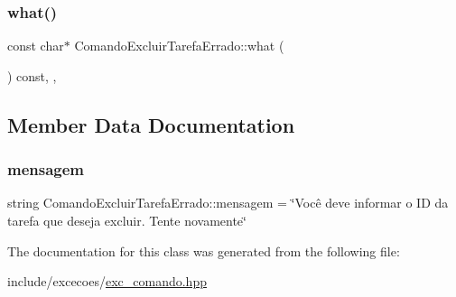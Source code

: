 \subsubsection{\texorpdfstring{what()}{what()}}
{\footnotesize\ttfamily const char$\ast$ Comando\+Excluir\+Tarefa\+Errado\+::what (\begin{DoxyParamCaption}{ }\end{DoxyParamCaption}) const\hspace{0.3cm}{\ttfamily [inline]}, {\ttfamily [override]}, {\ttfamily [noexcept]}}



\subsection{Member Data Documentation}
\mbox{\label{classComandoExcluirTarefaErrado_a0223bc12d367ca404bab4ec1f5a084cf}} 
\subsubsection{\texorpdfstring{mensagem}{mensagem}}
{\footnotesize\ttfamily string Comando\+Excluir\+Tarefa\+Errado\+::mensagem = \char`\"{}Você deve informar o ID da tarefa que deseja excluir. Tente novamente\char`\"{}\hspace{0.3cm}{\ttfamily [private]}}



The documentation for this class was generated from the following file\+:\begin{DoxyCompactItemize}
\item 
include/excecoes/\hyperlink{exc__comando_8hpp}{exc\+\_\+comando.\+hpp}\end{DoxyCompactItemize}
